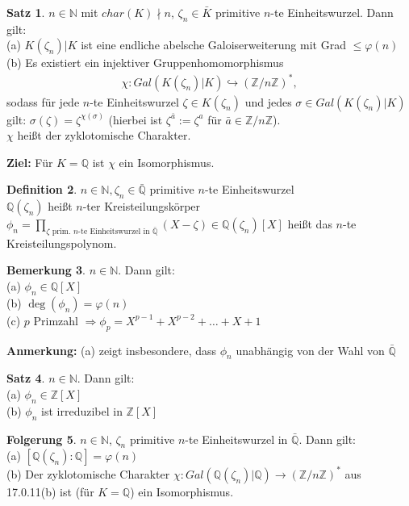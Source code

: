 \documentclass[10pt,a4paper,numbers=endperiod]{scrreprt}
\theoremstyle{definition}
\newtheorem{satz}{Satz}[section]
\newtheorem{defi}[satz]{Definition}
\newtheorem{bem}[satz]{Bemerkung}
\newtheorem{folg}[satz]{Folgerung}
\def\QQ{{\mathbb Q}}
\def\NN{{\mathbb N}}
\def\ZZ{{\mathbb Z}}
\begin{document}
\begin{satz}
	$n \in \NN$ mit $char(K) \nmid n$, $\zeta_n \in \bar{K}$ primitive $n$-te Einheitswurzel. Dann gilt:\\
	(a) $K(\zeta_n)|K$ ist eine endliche abelsche Galoiserweiterung mit Grad $\leq \varphi(n)$\\
	(b) Es existiert ein injektiver Gruppenhomomorphismus
	\begin{align*}
	\chi: Gal(K(\zeta_n)|K) \hookrightarrow (\ZZ/n\ZZ)^*,
	\end{align*}  
	sodass für jede $n$-te Einheitswurzel $\zeta \in K(\zeta_n)$ und jedes $\sigma \in Gal(K(\zeta_n)|K)$ gilt: $\sigma(\zeta) = \zeta^{\chi(\sigma)}$ (hierbei ist $\zeta^{\bar{a}} := \zeta^a$ für $\bar{a} \in \ZZ/n\ZZ$).\\
	$\chi$ heißt der zyklotomische Charakter.
\end{satz}

\textbf{Ziel:} Für $K = \QQ$ ist $\chi$ ein Isomorphismus.

\begin{defi}
	$n \in \NN, \zeta_n \in \bar{\QQ}$ primitive $n$-te Einheitswurzel\\
	$\QQ(\zeta_n)$ heißt $n$-ter Kreisteilungskörper\\
	$\phi_n = \prod\limits_{\zeta \text{ prim. $n$-te Einheitswurzel in } \bar{\QQ}} (X- \zeta) \in \QQ(\zeta_n)[X]$ heißt das $n$-te Kreisteilungspolynom.
\end{defi}

\begin{bem}
	$n \in \NN$. Dann gilt:\\
	(a) $\phi_n \in \QQ[X]$\\
	(b) $\deg(\phi_n) = \varphi(n)$\\
	(c) $p$ Primzahl $\Rightarrow \phi_p = X^{p-1} + X^{p-2} + \ldots + X+1$
\end{bem}

\textbf{Anmerkung:} (a) zeigt insbesondere, dass $\phi_n$ unabhängig von der Wahl von $\bar{\QQ}$

\begin{satz}
	$n \in \NN$. Dann gilt:\\
	(a) $\phi_n \in \ZZ[X]$\\
	(b) $\phi_n$ ist irreduzibel in $\ZZ[X]$ 
\end{satz}

\begin{folg}
	$n \in \NN$, $\zeta_n$ primitive $n$-te Einheitswurzel in $\bar{\QQ}$. Dann gilt:\\
	(a) $[\QQ(\zeta_n): \QQ] = \varphi(n)$\\
	(b) Der zyklotomische Charakter $\chi: Gal(\QQ(\zeta_n)|\QQ) \rightarrow (\ZZ/n\ZZ)^*$ aus 17.0.11(b) ist (für $K = \QQ$) ein Isomorphismus.
\end{folg}
\end{document}
